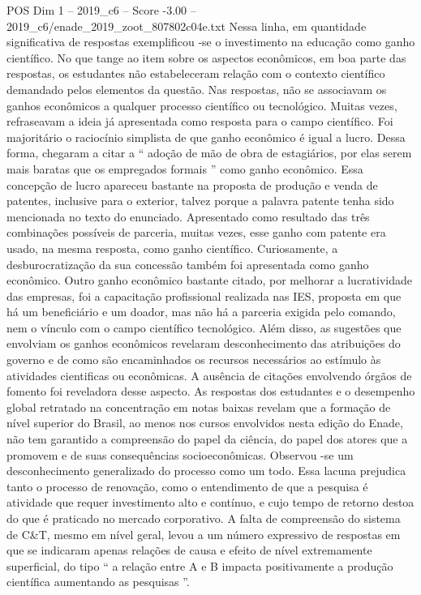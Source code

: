 \begin{textsample}{POS Dim 1 – 2019\_c6 – Score -3.00 – 2019\_c6/enade\_2019\_zoot\_807802c04e.txt}
Nessa linha, em quantidade significativa de respostas exemplificou -se o investimento na educação como ganho científico.
No que tange ao item sobre os aspectos econômicos, em boa parte das respostas, os estudantes não estabeleceram relação com o contexto científico demandado pelos elementos da questão.
Nas respostas, não se associavam os ganhos econômicos a qualquer processo científico ou tecnológico.
Muitas vezes, refraseavam a ideia já apresentada como resposta para o campo científico.
Foi majoritário o raciocínio simplista de que ganho econômico é igual a lucro.
Dessa forma, chegaram a citar a “ adoção de mão de obra de estagiários, por elas serem mais baratas que os empregados formais ” como ganho econômico.
Essa concepção de lucro apareceu bastante na proposta de produção e venda de patentes, inclusive para o exterior, talvez porque a palavra patente tenha sido mencionada no texto do enunciado.
Apresentado como resultado das três combinações possíveis de parceria, muitas vezes, esse ganho com patente era usado, na mesma resposta, como ganho científico.
Curiosamente, a desburocratização da sua concessão também foi apresentada como ganho econômico.
Outro ganho econômico bastante citado, por melhorar a lucratividade das empresas, foi a capacitação profissional realizada nas IES, proposta em que há um beneficiário e um doador, mas não há a parceria exigida pelo comando, nem o vínculo com o campo científico tecnológico.
Além disso, as sugestões que envolviam os ganhos econômicos revelaram desconhecimento das atribuições do governo e de como são encaminhados os recursos necessários ao estímulo às atividades cientificas ou econômicas.
A ausência de citações envolvendo órgãos de fomento foi reveladora desse aspecto.
As respostas dos estudantes e o desempenho global retratado na concentração em notas baixas revelam que a formação de nível superior do Brasil, ao menos nos cursos envolvidos nesta edição do Enade, não tem garantido a compreensão do papel da ciência, do papel dos atores que a promovem e de suas consequências socioeconômicas.
Observou -se um desconhecimento generalizado do processo como um todo.
Essa lacuna prejudica tanto o processo de renovação, como o entendimento de que a pesquisa é atividade que requer investimento alto e contínuo, e cujo tempo de retorno destoa do que é praticado no mercado corporativo.
A falta de compreensão do sistema de C\&T, mesmo em nível geral, levou a um número expressivo de respostas em que se indicaram apenas relações de causa e efeito de nível extremamente superficial, do tipo “ a relação entre A e B impacta positivamente a produção científica aumentando as pesquisas ”.

\end{textsample}
